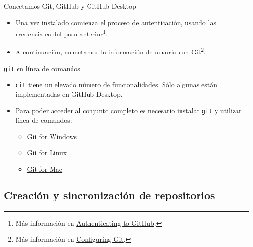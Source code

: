 \documentclass[aspectratio=169, xcolor={usenames,svgnames,dvipsnames}]{beamer}
\begin{document}
\begin{frame}[label={sec:org561279e}]{Conectamos Git, GitHub y GitHub Desktop}
\begin{itemize}
\item Una vez instalado comienza el proceso de autenticación, usando las credenciales del paso anterior\footnote{Más información en \href{https://help.github.com/desktop/guides/getting-started-with-github-desktop/authenticating-to-github/}{Authenticating to GitHub}.}.
\end{itemize}

\begin{center}
\end{center}


\begin{itemize}
\item A continuación, conectamos la información de usuario con Git\footnote{Más información en \href{https://help.github.com/desktop/guides/getting-started-with-github-desktop/configuring-git-for-github-desktop/}{Configuring Git}.}.
\end{itemize}

\begin{center}
\end{center}
\end{frame}

\begin{frame}[label={sec:orgdc25300},fragile]{\texttt{git} en línea de comandos}
 \begin{itemize}
\item \texttt{git} tiene un elevado número de funcionalidades. Sólo algunas están implementadas en GitHub Desktop.
\item Para poder acceder al conjunto completo es necesario instalar \texttt{git} y utilizar línea de comandos:
\begin{itemize}
\item \href{https://gitforwindows.org/}{Git for Windows}
\item \href{http://git-scm.com/download/linux}{Git for Linux}
\item \href{http://git-scm.com/download/mac}{Git for Mac}
\end{itemize}
\end{itemize}
\end{frame}

\subsection{Creación y sincronización de repositorios}
\label{sec:orgbee6531}
\end{document}
